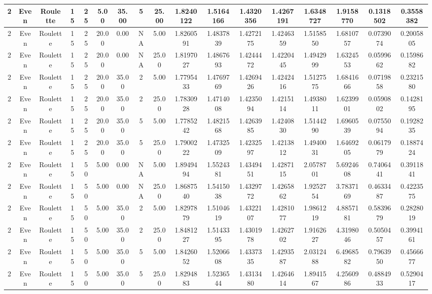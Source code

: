 \begin{longtable}{ | c | c | c | c | c | c | c | c | c | c | c | c | c | c | c | c | c | }
	\hline
	2	&	Even	&	Roulette	&	15	&	25	&	5.00	&	35.00	&	5	&	25.00	&	1.8240122	&	1.5164166	&	1.4320356	&	1.4267191	&	1.6348727	&	1.9158770	&	0.1318502	&	0.3558382 \\
	\hline
	2	&	Even	&	Roulette	&	15	&	25	&	20.00	&	0.00	&	NA	&	5.00	&	1.8260591	&	1.4837839	&	1.4272175	&	1.4246359	&	1.5158550	&	1.6810757	&	0.0739074	&	0.2005805 \\
	\hline
	2	&	Even	&	Roulette	&	15	&	25	&	20.00	&	0.00	&	NA	&	25.00	&	1.8197027	&	1.4867693	&	1.4244472	&	1.4220445	&	1.4942999	&	1.6324553	&	0.0599662	&	0.1598682 \\
	\hline
	2	&	Even	&	Roulette	&	15	&	25	&	20.00	&	35.00	&	2	&	5.00	&	1.7795433	&	1.4769769	&	1.4269426	&	1.4242416	&	1.5127575	&	1.6841666	&	0.0719858	&	0.2321580 \\
	\hline
	2	&	Even	&	Roulette	&	15	&	25	&	20.00	&	35.00	&	2	&	25.00	&	1.7830928	&	1.4714008	&	1.4235094	&	1.4215114	&	1.4938011	&	1.6239901	&	0.0590802	&	0.1428195 \\
	\hline
	2	&	Even	&	Roulette	&	15	&	25	&	20.00	&	35.00	&	5	&	5.00	&	1.7785242	&	1.4821568	&	1.4263985	&	1.4240830	&	1.5144290	&	1.6960539	&	0.0755094	&	0.1928235 \\
	\hline
	2	&	Even	&	Roulette	&	15	&	25	&	20.00	&	35.00	&	5	&	25.00	&	1.7900222	&	1.4732509	&	1.4232597	&	1.4213812	&	1.4940031	&	1.6469205	&	0.0617979	&	0.1887424 \\
	\hline
	2	&	Even	&	Roulette	&	15	&	50	&	5.00	&	0.00	&	NA	&	5.00	&	1.8949494	&	1.5524381	&	1.4349451	&	1.4287115	&	2.0578701	&	5.6924608	&	0.7406441	&	0.3911841 \\
	\hline
	2	&	Even	&	Roulette	&	15	&	50	&	5.00	&	0.00	&	NA	&	25.00	&	1.8687540	&	1.5415038	&	1.4329772	&	1.4265862	&	1.9252754	&	3.7837169	&	0.4633487	&	0.4223575 \\
	\hline
	2	&	Even	&	Roulette	&	15	&	50	&	5.00	&	35.00	&	2	&	5.00	&	1.8297879	&	1.5104619	&	1.4322107	&	1.4281077	&	1.9861219	&	4.8857181	&	0.5839679	&	0.2828019 \\
	\hline
	2	&	Even	&	Roulette	&	15	&	50	&	5.00	&	35.00	&	2	&	25.00	&	1.8481227	&	1.5143395	&	1.4301978	&	1.4262702	&	1.9162627	&	4.3198046	&	0.5050457	&	0.3994161 \\
	\hline
	2	&	Even	&	Roulette	&	15	&	50	&	5.00	&	35.00	&	5	&	5.00	&	1.8426052	&	1.5206608	&	1.4337335	&	1.4293587	&	2.0312488	&	6.4968582	&	0.7963950	&	0.4566677 \\
	\hline
	2	&	Even	&	Roulette	&	15	&	50	&	5.00	&	35.00	&	5	&	25.00	&	1.8294883	&	1.5236544	&	1.4313480	&	1.4264614	&	1.8941567	&	4.2560986	&	0.4884933	&	0.5290417 \\

\end{longtable}
